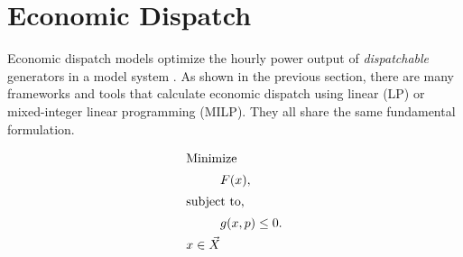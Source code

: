 \section{Economic Dispatch}

Economic dispatch models optimize the hourly power output of
\textit{dispatchable} generators in a model system
\cite{de_queiroz_repurposing_2019,neumann_near-optimal_2021}. As shown in the
previous section, there are many frameworks and tools that calculate economic
dispatch using linear (LP) or mixed-integer linear programming (MILP). They all
share the same fundamental formulation.

\begin{align}
    \intertext{Minimize}
    &F(x),\\
    \intertext{subject to,}
    &g(x, p) \leq 0.\\
    x \in \vec{X}
\end{align}